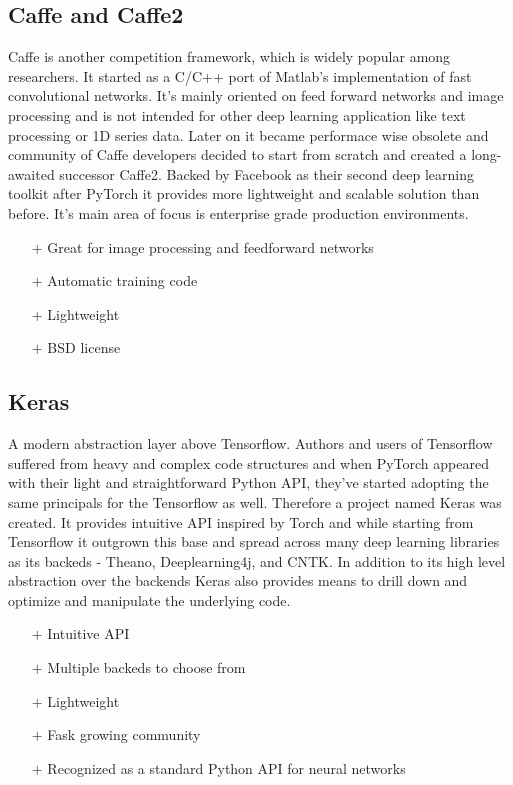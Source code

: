 \subsection{Caffe and Caffe2}

Caffe is another competition framework, which is widely popular among researchers. It started as a C/C++ port of Matlab's implementation of fast convolutional networks. It's mainly oriented on feed forward networks and image processing and is not intended for other deep learning application like text processing or 1D series data. Later on it became performace wise obsolete and community of Caffe developers decided to start from scratch and created a long-awaited successor Caffe2. Backed by Facebook as their second deep learning toolkit after PyTorch it provides more lightweight and scalable solution than before. It's main area of focus is enterprise grade production environments.

\begin{itemize}
    \item[$\boldsymbol{+}$] Great for image processing and feedforward networks
    \item[$\boldsymbol{+}$] Automatic training code
    \item[$\boldsymbol{+}$] Lightweight
    \item[$\boldsymbol{+}$] BSD license
\end{itemize}

\subsection{Keras}

A modern abstraction layer above Tensorflow. Authors and users of Tensorflow suffered from heavy and complex code structures and when PyTorch appeared with their light and straightforward Python API, they've started adopting the same principals for the Tensorflow as well. Therefore a project named Keras was created. It provides intuitive API inspired by Torch and while starting from Tensorflow it outgrown this base and spread across many deep learning libraries as its backeds - Theano, Deeplearning4j, and CNTK. In addition to its high level abstraction over the backends Keras also provides means to drill down and optimize and manipulate the underlying code.

\begin{itemize}
    \item[$\boldsymbol{+}$] Intuitive API
    \item[$\boldsymbol{+}$] Multiple backeds to choose from
    \item[$\boldsymbol{+}$] Lightweight
    \item[$\boldsymbol{+}$] Fask growing community
    \item[$\boldsymbol{+}$] Recognized as a standard Python API for neural networks
\end{itemize}

